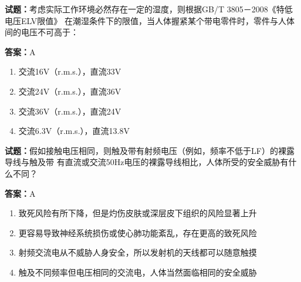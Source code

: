 \documentclass{ctexbook}
\begin{document}




\vspace{1em}

\textbf{试题：}考虑实际工作环境必然存在一定的湿度，则根据GB/T 3805－2008《特低电压ELV限值》
在潮湿条件下的限值，当人体握紧某个带电零件时，零件与人体间的电压不可高于： 

\textbf{答案：}A 

\begin{enumerate}[leftmargin=3em]
  \item 交流16V（r.m.s.），直流33V 

  \item 交流24V（r.m.s.），直流36V 

  \item 交流36V（r.m.s.），直流24V 

  \item 交流6.3V（r.m.s.），直流13.8V 

\end{enumerate}





\vspace{1em}

\textbf{试题：}假如接触电压相同，则触及带有射频电压（例如，频率不低于LF）的裸露导线与触及带
有直流或交流50Hz电压的裸露导线相比，人体所受的安全威胁有什么不同？ 

\textbf{答案：}A 

\begin{enumerate}[leftmargin=3em]
  \item 致死风险有所下降，但是灼伤皮肤或深层皮下组织的风险显著上升 

  \item 更容易导致神经系统损伤或使心肺功能紊乱，存在更高的致死风险 

  \item 射频交流电从不威胁人身安全，所以发射机的天线都可以随意触摸 

  \item 触及不同频率但电压相同的交流电，人体当然面临相同的安全威胁 

\end{enumerate}



\end{document}
